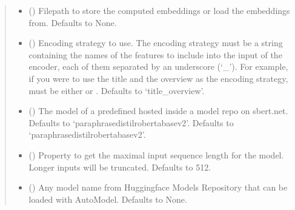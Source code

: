 \documentclass[letterpaper,10pt,english]{sphinxmanual}
\begin{document}
\begin{fulllineitems}
\begin{fulllineitems}
\begin{quote}
\begin{description}
\begin{itemize}
\item {} 
 (\sphinxstyleliteralemphasis{\sphinxupquote{, }}) \textendash{} Filepath to store the computed embeddings
or load the embeddings from. Defaults to None.

\item {} 
 (\sphinxstyleliteralemphasis{\sphinxupquote{, }}) \textendash{} Encoding strategy to use. The encoding strategy
must be a string containing the names of the features to include into
the input of the encoder, each of them separated by an underscore (‘\_’).
For example, if you were to use the title and the overview as the encoding        
strategy,  must be either  or .
Defaults to ‘title\_overview’.

\item {} 
 (\sphinxstyleliteralemphasis{\sphinxupquote{, }}) \textendash{} The model  of a predefined
 hosted inside a model repo on sbert.net. Defaults
to ‘paraphrase\sphinxhyphen{}distilroberta\sphinxhyphen{}base\sphinxhyphen{}v2’. Defaults to ‘paraphrase\sphinxhyphen{}distilroberta\sphinxhyphen{}base\sphinxhyphen{}v2’.

\item {} 
 (\sphinxstyleliteralemphasis{\sphinxupquote{, }}) \textendash{} Property to get the maximal input sequence
length for the model. Longer inputs will be truncated. Defaults to 512.

\item {} 
 (\sphinxstyleliteralemphasis{\sphinxupquote{, }}) \textendash{} Any model name from Huggingface Models
Repository that can be loaded with AutoModel. Defaults to None.


\end{itemize}
\end{description}
\end{quote}
\end{fulllineitems}
\end{fulllineitems}
\end{document}
